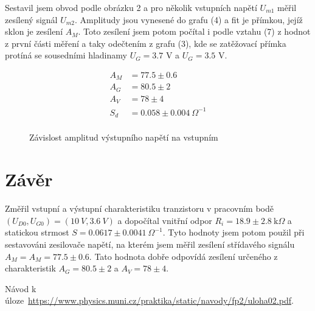 \documentclass[a4paper,11pt]{article}
\begin{document}
Sestavil jsem obvod podle obrázku 2 a pro několik vstupních napětí $ U_{m1} $ měřil zesílený signál $ U_{m2} $. Amplitudy jsou vynesené do grafu (4) a fit je přímkou, jejíž sklon je zesílení $ A_M $. Toto zesílení jsem potom počítal i podle vztahu (7) z hodnot z první části měření a taky odečtením z grafu (3), kde se zatěžovací přímka protíná se sousedními hladinamy $ U_G = 3.7 $ V a $ U_G = 3.5 $ V.

\begin{align*}
   A_M &= 77.5 \pm 0.6 \\
   A_G &= 80.5 \pm 2 \\
   A_V &= 78 \pm 4 \\
   S_d &= 0.058 \pm 0.004 \ \Omega^{-1} \\
\end{align*}

\begin{figure}[htpb]
    \centering
    
    \captionsetup{type=graph}
    \caption{Závislost amplitud výstupního napětí na vstupním}
\end{figure}

\section{Závěr}

Změřil vstupní a výstupní charakteristiku tranzistoru v pracovním bodě $ (U_{D0}, U_{G0}) = ( 10 \ V, 3.6 \ V ) $ a dopočítal vnitřní odpor $ R_i = 18.9 \pm 2.8 \ \text{k}\Omega $ a statickou strmost $ S = 0.0617 \pm 0.0041 \ \Omega^{-1} $. Tyto hodnoty jsem potom použil při sestavováni zesilovače napětí, na kterém jsem měřil zesílení střídavého signálu $ A_M = A_M = 77.5 \pm 0.6 $. Tato hodnota dobře odpovídá zesílení určeného z charakteristik $ A_G = 80.5 \pm 2 $ a $ A_V = 78 \pm 4 $.
   
   

\begin{thebibliography}{0}
 Návod k úloze~\url{https://www.physics.muni.cz/praktika/static/navody/fp2/uloha02.pdf}.   
\end{thebibliography}
\end{document}
